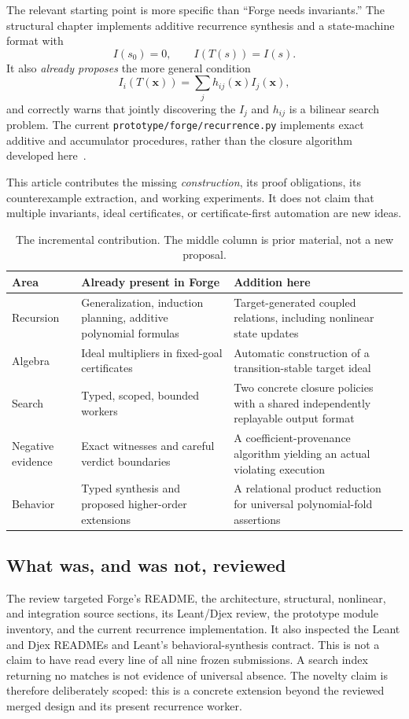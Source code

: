 \documentclass[11pt,letterpaper]{article}
\theoremstyle{definition}
\newcommand{\code}[1]{\nolinkurl{#1}}
\begin{document}
The relevant starting point is more specific than ``Forge needs invariants.''
The structural chapter implements additive recurrence synthesis and a
state-machine format with
\[
 I(s_0)=0,\qquad I(T(s))=I(s).
\]
It also \emph{already proposes} the more general condition
\[
 I_i(T(\bm x))=\sum_j h_{ij}(\bm x)I_j(\bm x),
\]
and correctly warns that jointly discovering the $I_j$ and $h_{ij}$ is a
bilinear search problem. The current \code{prototype/forge/recurrence.py}
implements exact additive and accumulator procedures, rather than the
closure algorithm developed here~\cite{forge-structural,forge-recurrence}.

This article contributes the missing \emph{construction}, its proof obligations,
its counterexample extraction, and working experiments. It does not claim that
multiple invariants, ideal certificates, or certificate-first automation are
new ideas.

\begin{table}[ht]
\centering\small
\begin{tabularx}{\linewidth}{@{}p{.25\linewidth}YY@{}}
\toprule
Area & Already present in Forge & Addition here\\
\midrule
Recursion & Generalization, induction planning, additive polynomial formulas
& Target-generated coupled relations, including nonlinear state updates\\[.5em]
Algebra & Ideal multipliers in fixed-goal certificates & Automatic construction
of a transition-stable target ideal\\[.5em]
Search & Typed, scoped, bounded workers & Two concrete closure policies with a
shared independently replayable output format\\[.5em]
Negative evidence & Exact witnesses and careful verdict boundaries & A
coefficient-provenance algorithm yielding an actual violating execution\\[.5em]
Behavior & Typed synthesis and proposed higher-order extensions & A relational
product reduction for universal polynomial-fold assertions\\
\bottomrule
\end{tabularx}
\caption{The incremental contribution. The middle column is prior material,
not a new proposal.}
\end{table}

\subsection{What was, and was not, reviewed}
The review targeted Forge's README, the architecture, structural, nonlinear,
and integration source sections, its Leant/Djex review, the prototype module
inventory, and the current recurrence implementation. It also inspected the
Leant and Djex READMEs and Leant's behavioral-synthesis contract. This is not a
claim to have read every line of all nine frozen submissions. A search index
returning no matches is not evidence of universal absence. The novelty claim is
therefore deliberately scoped: this is a concrete extension beyond the reviewed
merged design and its present recurrence worker.
\end{document}
